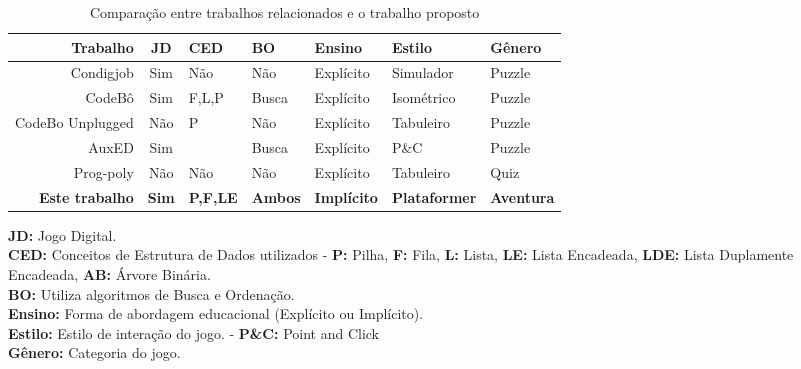 \begin{table}[H]
	\caption{Comparação entre trabalhos relacionados e o trabalho proposto}
	\label{tab:cmp_trabalhos_relatos}
	\centering
	\footnotesize
	\begin{tabular}{r|clllll}
		\toprule
		\textbf{Trabalho}      & \textbf{JD}  & \textbf{CED}    & \textbf{BO}    & \textbf{Ensino}    & \textbf{Estilo}      & \textbf{Gênero}   \\
		\midrule
		Condigjob              & Sim          & Não             & Não            & Explícito          & Simulador            & Puzzle            \\
		CodeBô                 & Sim          & F,L,P           & Busca          & Explícito          & Isométrico           & Puzzle            \\
		CodeBo Unplugged       & Não          & P               & Não            & Explícito          & Tabuleiro            & Puzzle            \\
		AuxED                  & Sim          &                 & Busca          & Explícito          & P\&C                 & Puzzle            \\
		Prog-poly              & Não          & Não             & Não            & Explícito          & Tabuleiro            & Quiz              \\
		\rowcolor{gray!20}
		\textbf{Este trabalho} & \textbf{Sim} & \textbf{P,F,LE} & \textbf{Ambos} & \textbf{Implícito} & \textbf{Plataformer} & \textbf{Aventura} \\
		\bottomrule
	\end{tabular}

	\vspace{1.25em}
	\begin{minipage}{0.8\linewidth}
		\footnotesize
		\textbf{JD:} Jogo Digital. \\
		\textbf{CED:} Conceitos de Estrutura de Dados utilizados -
		\textbf{P:} Pilha, \textbf{F:} Fila, \textbf{L:} Lista, \textbf{LE:} Lista Encadeada, \textbf{LDE:} Lista Duplamente Encadeada, \textbf{AB:} Árvore Binária. \\
		\textbf{BO:} Utiliza algoritmos de Busca e Ordenação. \\
		\textbf{Ensino:} Forma de abordagem educacional (Explícito ou Implícito). \\
		\textbf{Estilo:} Estilo de interação do jogo. - \textbf{P\&C:} Point and Click \\
		\textbf{Gênero:} Categoria do jogo.
	\end{minipage}
\end{table}
